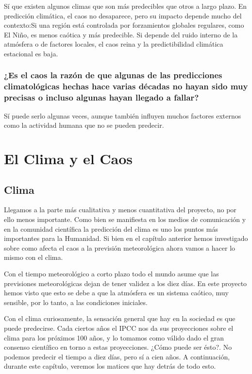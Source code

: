 \documentclass[
  10pt,
  a4paper,
  DIV=11,
  numbers=noendperiod,
  open=any]{scrreprt}
\numberwithin{equation}{chapter}
\numberwithin{equation}{section}
\renewcommand{\[}{\begin{equation}}
\renewcommand{\]}{\end{equation}}
\begin{document}
Sí que existen algunos climas que son más predecibles que otros a largo
plazo. En predicción climática, el caos no desaparece, pero su impacto
depende mucho del contexto:Si una región está controlada por
forzamientos globales regulares, como El Niño, es menos caótica y más
predecible. Si depende del ruido interno de la atmósfera o de factores
locales, el caos reina y la predictibilidad climática estacional es
baja.

\section{¿Es el caos la razón de que algunas de las predicciones
climatológicas hechas hace varias décadas no hayan sido muy precisas o
incluso algunas hayan llegado a
fallar?}\label{es-el-caos-la-razuxf3n-de-que-algunas-de-las-predicciones-climatoluxf3gicas-hechas-hace-varias-duxe9cadas-no-hayan-sido-muy-precisas-o-incluso-algunas-hayan-llegado-a-fallar}

Sí puede serlo algunas veces, aunque también influyen muchos factores
externos como la actividad humana que no se pueden predecir.

\part{El Clima y el Caos}

\chapter{Clima}\label{clima}

Llegamos a la parte más cualitativa y menos cuantitativa del proyecto,
no por ello menos importante. Como bien se manifiesta en los medios de
comunicación y en la comunidad científica la predicción del clima es uno
los puntos más importantes para la Humanidad. Si bien en el capítulo
anterior hemos investigado sobre como afecta el caos a la previsión
meteorológica ahora vamos a hacer lo mismo con el clima.

Con el tiempo meteorológico a corto plazo todo el mundo asume que las
previsiones meteorológicas dejan de tener validez a los diez días. En
este proyecto hemos visto que esto se debe a que la atmósfera es un
sistema caótico, muy sensible, por lo tanto, a las condiciones
iniciales.

Con el clima curiosamente, la sensación general que hay en la sociedad
es que puede predecirse. Cada ciertos años el IPCC nos da sus
proyecciones sobre el clima para los próximos 100 años, y lo tomamos
como válido dado el gran consenso científico en torno a estas
proyecciones. ¿Cómo puede ser ésto?. No podemos predecir el tiempo a
diez días, pero sí a cien años. A continuación, durante este capítulo,
veremos los matices que hay detrás de todo esto.
\end{document}
